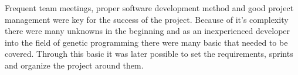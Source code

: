 Frequent team meetings, proper software development method and good project management were key for the success of the project.
Because of it's complexity there were many unknowns in the beginning and as an inexperienced developer into the field of genetic
programming there were many basic that needed to be covered. Through this basic it was later possible to set the requirements,
sprints and organize the project around them.